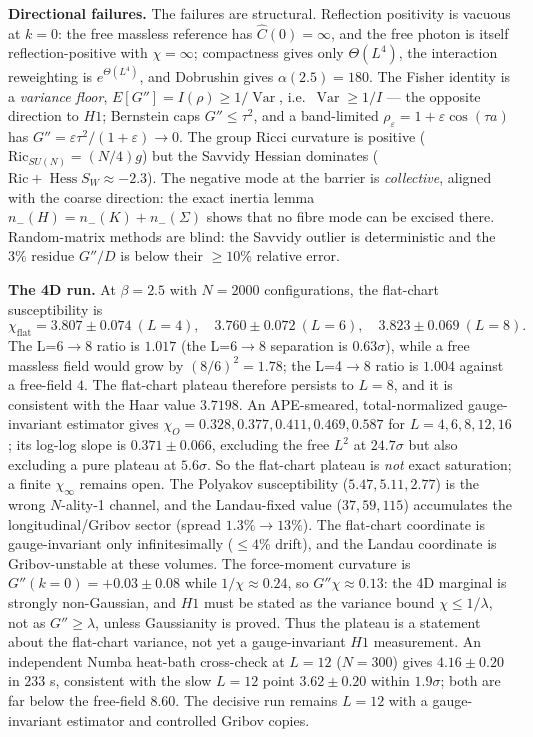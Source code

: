 \documentclass[11pt,a4paper]{article}
\begin{document}
\textbf{Directional failures.} The failures are structural. Reflection positivity is vacuous at
$k=0$: the free massless reference has $\hat C(0)=\infty$, and the free photon is itself
reflection-positive with $\chi=\infty$; compactness gives only $\Theta(L^4)$, the interaction
reweighting is $e^{\Theta(L^4)}$, and Dobrushin gives $\alpha(2.5)=180$. The Fisher identity is a
\emph{variance floor}, $E[G'']=I(\rho)\ge1/\operatorname{Var}$, i.e.\
$\operatorname{Var}\ge1/I$ --- the opposite direction to $H1$; Bernstein caps $G''\le\tau^2$, and a
band-limited $\rho_\varepsilon=1+\varepsilon\cos(\tau a)$ has
$G''=\varepsilon\tau^2/(1+\varepsilon)\to0$. The group Ricci curvature is positive
($\mathrm{Ric}_{SU(N)}=(N/4)g$) but the Savvidy Hessian dominates
($\mathrm{Ric}+\operatorname{Hess}S_W\approx-2.3$). The negative mode at the barrier is
\emph{collective}, aligned with the coarse direction: the exact inertia lemma
$n_-(H)=n_-(K)+n_-(\Sigma)$ shows that no fibre mode can be excised there. Random-matrix methods
are blind: the Savvidy outlier is deterministic and the $3\%$ residue $G''/D$ is below their
$\ge10\%$ relative error.

\textbf{The 4D run.} At $\beta=2.5$ with $N=2000$ configurations, the flat-chart susceptibility is
\begin{equation}
  \chi_{\mathrm{flat}}=3.807\pm0.074\ (L=4),\quad
  3.760\pm0.072\ (L=6),\quad
  3.823\pm0.069\ (L=8).
  \label{eq:m1plateau}
\end{equation}
The L=6$\to$8 ratio is $1.017$ (the L=6$\to$8 separation is $0.63\sigma$), while a free massless field
would grow by $(8/6)^2=1.78$; the L=4$\to$8 ratio is $1.004$ against a free-field $4$. The
flat-chart plateau therefore persists to $L=8$, and it is consistent with the Haar value $3.7198$.
An APE-smeared, total-normalized gauge-invariant estimator gives
$\chi_O=0.328,0.377,0.411,0.469,0.587$ for $L=4,6,8,12,16$; its log-log slope is
$0.371\pm0.066$, excluding the free $L^2$ at $24.7\sigma$ but also excluding a pure plateau at
$5.6\sigma$. So the flat-chart plateau is \emph{not} exact saturation; a finite $\chi_\infty$ remains
open. The Polyakov susceptibility ($5.47,5.11,2.77$) is the wrong $N$-ality-1 channel, and the
Landau-fixed value ($37,59,115$) accumulates the longitudinal/Gribov sector (spread $1.3\%\to13\%$).
The flat-chart coordinate is gauge-invariant only infinitesimally ($\le4\%$ drift), and the Landau
coordinate is Gribov-unstable at these volumes. The force-moment
curvature is $G''(k=0)=+0.03\pm0.08$ while $1/\chi\approx0.24$, so $G''\chi\approx0.13$: the 4D
marginal is strongly non-Gaussian, and $H1$ must be stated as the variance bound
$\chi\le1/\lambda$, not as $G''\ge\lambda$, unless Gaussianity is proved. Thus the plateau is a
statement about the flat-chart variance, not yet a gauge-invariant $H1$ measurement. An independent
Numba heat-bath cross-check at $L=12$ ($N=300$) gives $4.16\pm0.20$ in $233$ s, consistent with the
slow $L=12$ point $3.62\pm0.20$ within $1.9\sigma$; both are far below the free-field $8.60$. The
decisive run remains $L=12$ with a gauge-invariant estimator and controlled Gribov copies.
\end{document}
